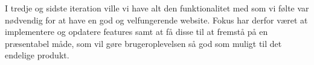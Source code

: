 I tredje og sidste iteration ville vi have alt den funktionalitet med som vi følte var nødvendig for at have en god og velfungerende website. Fokus har derfor været at implementere og opdatere features samt at få disse til at fremstå på en præsentabel måde, som vil gøre brugeroplevelsen så god som muligt til det endelige produkt.
















